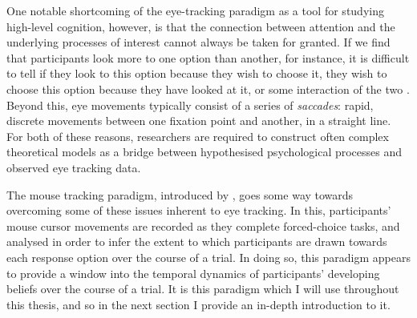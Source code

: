 One notable shortcoming of the eye-tracking paradigm
as a tool for studying high-level cognition, however,
is that the connection between attention
and the underlying processes of interest cannot always be taken for granted.
If we find that participants look more to one option than another,
for instance, it is difficult to tell if
they look to this option because they wish to choose it,
they wish to choose this option because they have looked at it,
or some interaction of the two \citep[see][]{Krajbich2011}.
Beyond this, eye movements typically consist of 
a series of \emph{saccades}: rapid, discrete movements
between one fixation point and another, in a straight line.
For both of these reasons, researchers are required to
construct often complex theoretical models
as a bridge between hypothesised psychological processes
and observed eye tracking data.

The mouse tracking paradigm,
introduced by \citet{Spivey2005},
goes some way towards overcoming
some of these issues inherent to eye tracking.
In this, participants' mouse cursor movements are recorded
as they complete forced-choice tasks,
and analysed in order to infer the extent to which
participants are drawn towards each response option
over the course of a trial.
In doing so, this paradigm appears to provide
a window into the temporal dynamics of
participants' developing beliefs over the course of a trial.
It is this paradigm which I will use throughout this thesis,
and so in the next section I provide an in-depth introduction to it.




